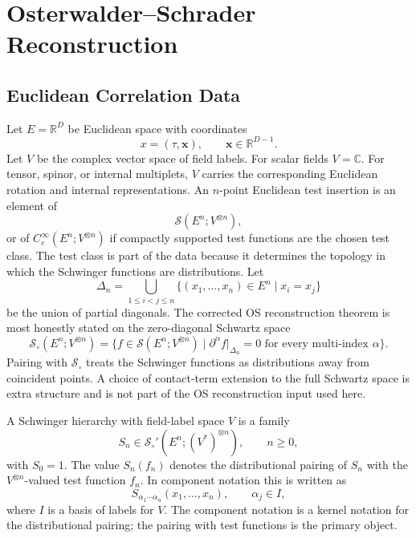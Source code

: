 \chapter{Osterwalder--Schrader Reconstruction}
\label{ch:volume-iv-osterwalder-schrader-reconstruction}
\ConventionsMixed

\label{ch:os-reconstruction}

\section{Euclidean Correlation Data}

Let \(E=\mathbb R^D\) be Euclidean space with coordinates
\[
  x=(\tau,\mathbf x),\qquad \mathbf x\in\mathbb R^{D-1}.
\]
Let \(V\) be the complex vector space of field labels.  For scalar fields
\(V=\mathbb C\).  For tensor, spinor, or internal multiplets, \(V\) carries the
corresponding Euclidean rotation and internal representations.  An \(n\)-point
Euclidean test insertion is an element of
\[
  \mathcal S(E^n;V^{\otimes n}),
\]
or of \(C_c^\infty(E^n;V^{\otimes n})\) if compactly supported test functions
are the chosen test class.  The test class is part of the data because it
determines the topology in which the Schwinger functions are distributions.
Let
\[
  \Delta_n
  =
  \bigcup_{1\le i<j\le n}\{(x_1,\ldots,x_n)\in E^n\mid x_i=x_j\}
\]
be the union of partial diagonals.  The corrected OS reconstruction theorem is
most honestly stated on the zero-diagonal Schwartz space
\[
  \mathcal S_\circ(E^n;V^{\otimes n})
  =
  \{f\in\mathcal S(E^n;V^{\otimes n})
    \mid \partial^\alpha f|_{\Delta_n}=0\text{ for every multi-index }\alpha\}.
\]
Pairing with \(\mathcal S_\circ\) treats the Schwinger functions as
distributions away from coincident points.  A choice of contact-term extension
to the full Schwartz space is extra structure and is not part of the OS
reconstruction input used here.

\begin{definition}
A Schwinger hierarchy with field-label space \(V\) is a family
\[
  S_n\in \mathcal S_\circ'(E^n;(V^*)^{\otimes n}),
  \qquad n\ge0,
\]
with \(S_0=1\).  The value \(S_n(f_n)\) denotes the distributional pairing of
\(S_n\) with the \(V^{\otimes n}\)-valued test function \(f_n\).  In
component notation this is written as
\[
  S_{\alpha_1\cdots\alpha_n}(x_1,\ldots,x_n),
  \qquad \alpha_j\in I,
\]
where \(I\) is a basis of labels for \(V\).  The component notation is a
kernel notation for the distributional pairing; the pairing with test
functions is the primary object.
\end{definition}

